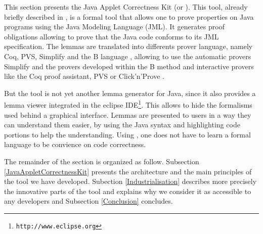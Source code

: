   This section presents the Java Applet Correctness Kit
 (or \JACK).  This tool, already briefly described in
 \cite{BR-gdc2002}, is a formal tool that allows one to prove properties on
 Java programs using the Java Modeling Language \cite{Leavens-Baker-Ruby03} (JML).
 It generates proof obligations
 allowing to prove that the Java code conforms to its JML
 specification.  The lemmas are translated into differents prover language, namely Coq, PVS, Simplify and the B language \cite{bbook},
 allowing to use the automatic provers Simplify and the provers developed within the B method and interactive provers like the Coq proof assistant, PVS or Click'n'Prove .

 But the tool is not yet another lemma generator for Java, since it also provides a lemma
 viewer integrated in the eclipse
 IDE\footnote{\texttt{http://www.eclipse.org}}.  This allows to
 hide the formalisms used behind a graphical interface.  Lemmas are
 presented to users in a way they can understand them easier, by using the Java syntax and highlighting code portions to help
 the understanding. Using \JACK, one does not have to learn a formal language to be convience on
code correctness.

 The remainder of the section is organized as follow.  Subsection \ref{JavaAppletCorrectnessKit} presents the
 architecture and the main principles of the tool we have
 developed. Subection \ref{Industrialisation} describes more precisely
 the innovative parts of the tool and explains why we consider it as
 accessible to any developers and Subsection \ref{Conclusion} concludes.
